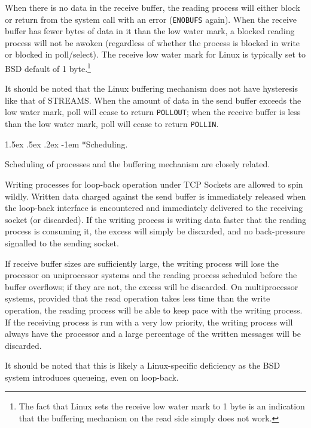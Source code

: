 \documentclass[letterpaper,final,notitlepage,twocolumn,10pt,twoside]{article}
\makeatletter
\renewcommand\paragraph{\@startsection{paragraph}{4}{\z@}%
                                    {1.5ex \@plus .5ex \@minus .2ex}%
                                    {-1em}%
                                    {\normalfont\normalsize\bfseries\slshape}}
\makeatother
\begin{document}
When there is no data in the receive buffer, the reading process will either block or return from
the system call with an error (\texttt{ENOBUFS} again).  When the receive buffer has fewer bytes of
data in it than the low water mark, a blocked reading process will not be awoken (regardless of
whether the process is blocked in write or blocked in poll/select).  The receive low water mark for
Linux is typically set to BSD default of 1 byte.\footnote{The fact that Linux sets the receive low
water mark to 1 byte is an indication that the buffering mechanism on the read side simply does not
work.}

It should be noted that the Linux buffering mechanism does not have hysteresis like that of STREAMS.
When the amount of data in the send buffer exceeds the low water mark, poll will cease to return
\texttt{POLLOUT}; when the receive buffer is less than the low water mark, poll will cease to return
\texttt{POLLIN}.

\paragraph*{Scheduling.}

Scheduling of processes and the buffering mechanism are closely related.

Writing processes for loop-back operation under TCP Sockets are allowed to spin wildly.  Written data
charged against the send buffer is immediately released when the loop-back interface is encountered
and immediately delivered to the receiving socket (or discarded).  If the writing process is writing
data faster that the reading process is consuming it, the excess will simply be discarded, and no
back-pressure signalled to the sending socket.

If receive buffer sizes are sufficiently large, the writing process will lose the processor on
uniprocessor systems and the reading process scheduled before the buffer overflows; if they are not,
the excess will be discarded.  On multiprocessor systems, provided that the read operation takes
less time than the write operation, the reading process will be able to keep pace with the writing
process.  If the receiving process is run with a very low priority, the writing process will always
have the processor and a large percentage of the written messages will be discarded.

It should be noted that this is likely a Linux-specific deficiency as the BSD system introduces
queueing, even on loop-back.
\end{document}

